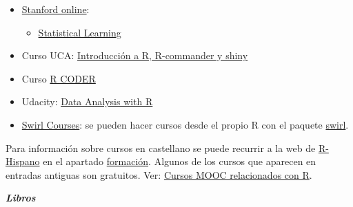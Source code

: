 \documentclass[
]{book}
\providecommand{\tightlist}{%
  \setlength{\itemsep}{0pt}\setlength{\parskip}{0pt}}
\theoremstyle{break}
\theoremstyle{definition}
\theoremstyle{definition}
\theoremstyle{definition}
\theoremstyle{remark}
\begin{document}
\begin{itemize}
\item
  \href{http://online.stanford.edu/courses}{Stanford online}:

  \begin{itemize}
  \tightlist
  \item
    \href{http://online.stanford.edu/course/statistical-learning}{Statistical Learning}
  \end{itemize}
\end{itemize}

\begin{itemize}
\tightlist
\item
  Curso UCA: \href{http://knuth.uca.es/moodle/course/view.php?id=51}{Introducción a R, R-commander y shiny}
\end{itemize}

\begin{itemize}
\tightlist
\item
  Curso \href{https://r-coder.com/curso-r}{R CODER}
\end{itemize}

\begin{itemize}
\tightlist
\item
  Udacity: \href{https://eu.udacity.com/course/data-analysis-with-r--ud651}{Data Analysis with R}
\end{itemize}

\begin{itemize}
\tightlist
\item
  \href{https://swirlstats.com/scn/title.html}{Swirl Courses}:
  se pueden hacer cursos desde el propio R con el paquete
  \href{https://swirlstats.com}{swirl}.
\end{itemize}

Para información sobre cursos en castellano se puede recurrir a la web de \href{http://r-es.org/}{R-Hispano} en el apartado \href{http://r-es.org/category/formacion}{formación}. Algunos de los cursos que aparecen en entradas antiguas son gratuitos.
Ver: \href{http://r-es.org/2016/02/12/cursos-masivos-y-otra-formacion-on-line-sobre-r/}{Cursos MOOC relacionados con R}.

\textbf{\emph{Libros}}
\end{document}
